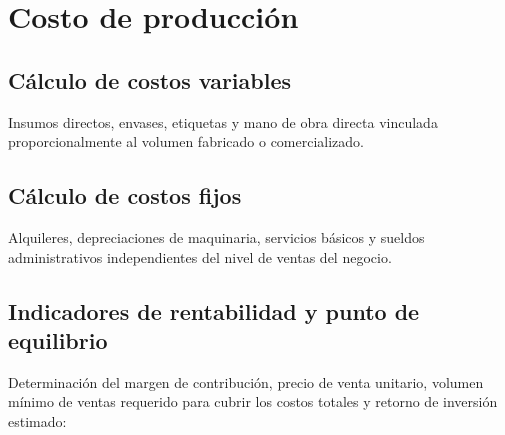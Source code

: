 \section{Costo de producción}
\label{sec:costo_produccion}

\subsection{Cálculo de costos variables}
Insumos directos, envases, etiquetas y mano de obra directa vinculada proporcionalmente al volumen fabricado o comercializado.

\subsection{Cálculo de costos fijos}
Alquileres, depreciaciones de maquinaria, servicios básicos y sueldos administrativos independientes del nivel de ventas del negocio.



\subsection{Indicadores de rentabilidad y punto de equilibrio}
Determinación del margen de contribución, precio de venta unitario, volumen mínimo de ventas requerido para cubrir los costos totales y retorno de inversión estimado:



